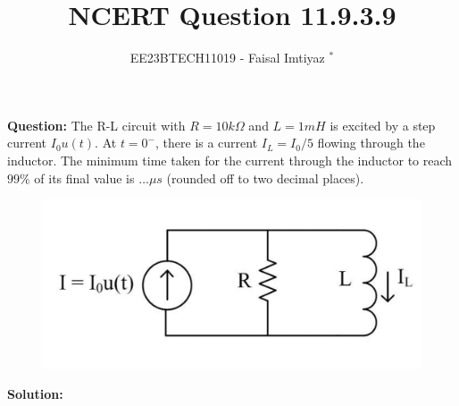 \documentclass[journal,12pt,twocolumn]{IEEEtran}
\theoremstyle{remark}
\begin{document}

\vspace{3cm}
\title{NCERT Question 11.9.3.9}
\author{EE23BTECH11019 - Faisal Imtiyaz $^{*}$%
}
\maketitle
\newpage
\bigskip

\renewcommand{\thefigure}{\arabic{figure}}
\renewcommand{\thetable}{\arabic{table}}


\vspace{3cm}
\textbf{Question:}
The R-L circuit with $R=10 k\Omega$ and $L=1 mH$ is excited by a step current $I_0u(t)$. At $t=0^-$, there is a current $I_L=I_0/5$ flowing through the inductor. The minimum time taken for the current through the inductor to reach $99\%$ of its final value is $\ldots \mu s$
(rounded off to two decimal places).\\
\begin{figure}[h!]
    \centering
    \includegraphics[width=0.8\columnwidth]{question.png}
\end{figure}
\textbf{Solution:}\\
\fi
{}

\end{document}
